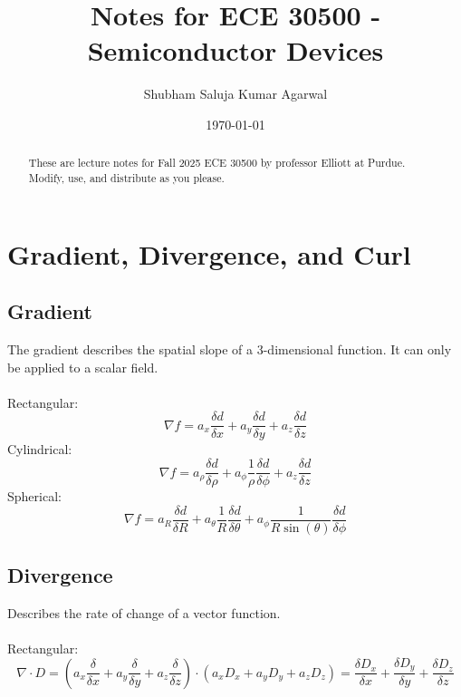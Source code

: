 \documentclass[nobib]{tufte-handout}
\title{Notes for ECE 30500 - Semiconductor Devices}
\author[Shubham Saluja Kumar Agarwal]{Shubham Saluja Kumar Agarwal}
\date{\today}  %
\begin{document}
\maketitle

\begin{abstract}
    These are lecture notes for Fall 2025 ECE 30500 by professor Elliott at Purdue. Modify, use, and distribute as you please.
\end{abstract}

\tableofcontents

\newpage

\section{Gradient, Divergence, and Curl}
\subsection{Gradient}
The gradient describes the spatial slope of a 3-dimensional function. It can only be applied to a scalar field.\\~\\
Rectangular:
\begin{equation*}
    \nabla f = a_x \frac{\delta d}{\delta x}+a_y \frac{\delta d}{\delta y}+a_z \frac{\delta d}{\delta z}
\end{equation*}
Cylindrical:
\begin{equation*}
    \nabla f = a_\rho \frac{\delta d}{\delta \rho}+a_\phi \frac{1}{\rho}\frac{\delta d}{\delta \phi}+a_z \frac{\delta d}{\delta z}
\end{equation*}
Spherical:
\begin{equation*}
    \nabla f = a_R \frac{\delta d}{\delta R}+a_\theta \frac{1}{R}\frac{\delta d}{\delta \theta}+a_\phi \frac{1}{R\sin(\theta)}\frac{\delta d}{\delta \phi}
\end{equation*}
\subsection{Divergence}
Describes the rate of change of a vector function.\\~\\
Rectangular:
\begin{equation*}
    \nabla \cdot D = \left(a_x \frac{\delta}{\delta x}+a_y \frac{\delta}{\delta y}+a_z \frac{\delta}{\delta z}\right)\cdot \left(a_x D_x +a_y D_y + a_z D_z\right) = \frac{\delta D_x}{\delta x}+\frac{\delta D_y}{\delta y}+\frac{\delta D_z}{\delta z}
\end{equation*}
\end{document}
